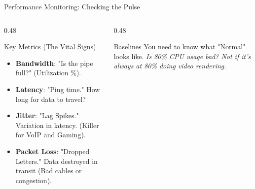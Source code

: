 \documentclass[aspectratio=169]{beamer}  %
\begin{document}
\begin{frame}{Performance Monitoring: Checking the Pulse}
    \begin{columns}[T]
        \begin{column}{0.48\textwidth}
            \begin{block}{Key Metrics (The Vital Signs)}
                \footnotesize
                \begin{itemize}
                    \item \textbf{Bandwidth}: "Is the pipe full?" (Utilization \%).
                    \item \textbf{Latency}: "Ping time." How long for data to travel?
                    \item \textbf{Jitter}: "Lag Spikes." Variation in latency. (Killer for VoIP and Gaming).
                    \item \textbf{Packet Loss}: "Dropped Letters." Data destroyed in transit (Bad cables or congestion).
                \end{itemize}
            \end{block}
        \end{column}
        \begin{column}{0.48\textwidth}
            \begin{center}
            \end{center}
            \begin{block}{Baselines}
                \footnotesize
                You need to know what "Normal" looks like.
                \textit{Is 80\% CPU usage bad? Not if it's always at 80\% doing video rendering.}
            \end{block}
        \end{column}
    \end{columns}
\end{frame}
\end{document}

